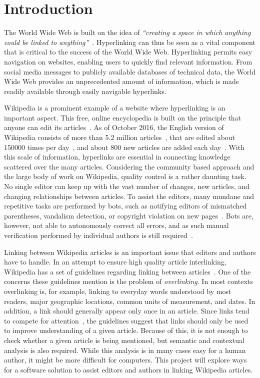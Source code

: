 \chapter{Introduction}\label{ch:introduction}

The World Wide Web is built on the idea of \emph{``creating a space in which anything could be linked to anything''}~\cite[p.~4]{Weaving-the-web}. Hyperlinking can thus be seen as a vital component that is critical to the success of the World Wide Web. Hyperlinking permits easy navigation on websites, enabling users to quickly find relevant  information. From social media messages to publicly available databases of technical data, the World Wide Web provides an unprecedented amount of information, which is made readily available through easily navigable hyperlinks.

Wikipedia is a prominent example of a website where hyperlinking is an important aspect. This free, online encyclopedia is built on the principle that anyone can edit its articles~\cite{wiki-about}. As of October 2016, the English version of Wikipedia consists of more than 5.2 million articles~\cite{wiki-about}, that are edited about \num{150000} times per day~\cite{wiki-num-edits}, and about 800 new articles are added each day~\cite{wmcharts}. With this scale of information, hyperlinks are essential in connecting knowledge scattered over the many articles. Considering the community based approach and the large body of work on Wikipedia, quality control is a rather daunting task. No single editor can keep up with the vast number of changes, new articles, and changing relationships between articles. To assist the editors, many mundane and repetitive tasks are performed by bots, such as notifying editors of mismatched parentheses, vandalism detection, or copyright violation on new pages~\cite{wiki-bots}. Bots are, however, not able to autonomously correct all errors, and as such manual verification performed by individual authors is still required~\cite{wiki-bot-policy}.

Linking between Wikipedia articles is an important issue that editors and authors have to handle. In an attempt to ensure high quality article interlinking, Wikipedia has a set of guidelines regarding linking between articles~\cite{wiki-editor-guidelines}. One of the concerns these guidelines mention is the problem of \emph{overlinking}. In most contexts overlinking is, for example, linking to everyday words understood by most readers, major geographic locations, common units of measurement, and dates. In addition, a link should generally appear only once in an article. Since links tend to compete for attention~\cite{hyperlink-structure-using-logs}, the guidelines suggest that links should only be used to improve understanding of a given article. Because of this, it is not enough to check whether a given article is being mentioned, but semantic and contextual analysis is also required. While this analysis is in many cases easy for a human author, it might be more difficult for computers. This project will explore ways for a software solution to assist editors and authors in linking Wikipedia articles.






